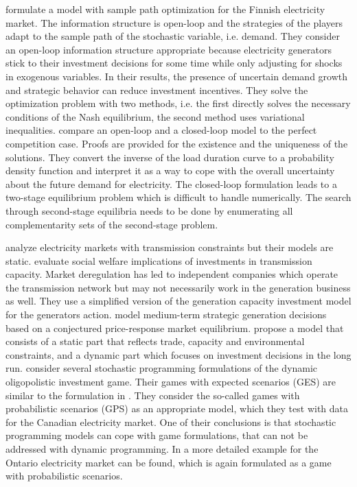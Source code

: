 \cite{Pineau2003} formulate a model with sample path optimization for the Finnish electricity market. The information structure is open-loop and the strategies of the players adapt to the sample path of the stochastic variable, i.e. demand. They consider an open-loop information structure appropriate because electricity generators stick to their investment decisions for some time while only adjusting for shocks in exogenous variables. In their results, the presence of uncertain demand growth and strategic behavior can reduce investment incentives. They solve the optimization problem with two methods, i.e. the first directly solves the necessary conditions of the Nash equilibrium, the second method uses variational inequalities. \cite{Murphy2005} compare an open-loop and a closed-loop model to the perfect competition case. Proofs are provided for the existence and the uniqueness of the solutions. They convert the inverse of the load duration curve to a probability density function and interpret it as a way to cope with the overall uncertainty about the future demand for electricity. The closed-loop formulation leads to a two-stage equilibrium problem which is difficult to handle numerically. The search through second-stage equilibria needs to be done by enumerating all complementarity sets of the second-stage problem.

\cite{Neuhoff2005} analyze electricity markets with transmission constraints but their models are static. \cite{Sauma2006} evaluate social welfare implications of investments in transmission capacity. Market deregulation has led to independent companies which operate the transmission network but may not necessarily work in the generation business as well. They use a simplified version of the \cite{Murphy2005} generation capacity investment model for the generators action. \cite{Centeno2007} model medium-term strategic generation decisions based on a conjectured price-response market equilibrium. \cite{Lise2008} propose a model that consists of a static part that reflects trade, capacity and environmental constraints, and a dynamic part which focuses on investment decisions in the long run. 
\cite{Genc2007} consider several stochastic programming formulations of the dynamic oligopolistic investment game. Their games with expected scenarios (GES) are similar to the formulation in \cite{Pineau2003}. They consider the so-called games with probabilistic scenarios (GPS) as an appropriate model, which they test with data for the Canadian electricity market. One of their conclusions is that stochastic programming models can cope with game formulations, that can not be addressed with dynamic programming. In \cite{Genc2008} a more detailed example for the Ontario electricity market can be found, which is again formulated as a game with probabilistic scenarios. 

